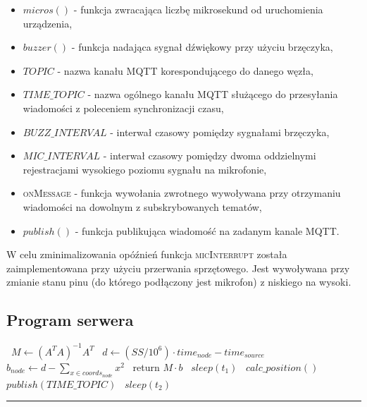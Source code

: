 \begin{itemize}
    \item $micros()$ {-} funkcja zwracająca liczbę mikrosekund od uruchomienia urządzenia,
    \item $buzzer()$ {-} funkcja nadająca sygnał dźwiękowy przy użyciu brzęczyka,
    \item $TOPIC$ {-} nazwa kanału MQTT korespondującego do danego węzła,
    \item $TIME\_TOPIC$ {-} nazwa ogólnego kanału MQTT służącego do przesyłania wiadomości z poleceniem synchronizacji czasu,
    \item $BUZZ\_INTERVAL$ {-} interwał czasowy pomiędzy sygnałami brzęczyka,
    \item $MIC\_INTERVAL$ {-} interwał czasowy pomiędzy dwoma oddzielnymi rejestracjami wysokiego poziomu sygnału na mikrofonie,
    \item \textsc{onMessage} {-} funkcja wywołania zwrotnego wywoływana przy otrzymaniu wiadomości na dowolnym z subskrybowanych tematów,
    \item $publish()$ {-} funkcja publikująca wiadomość na zadanym kanale MQTT.
\end{itemize}

W celu zminimalizowania opóźnień funkcja \textsc{micInterrupt} została zaimplementowana przy użyciu przerwania sprzętowego. Jest wywoływana przy zmianie stanu pinu (do którego podłączony jest mikrofon) z niskiego na wysoki.

\subsection{Program serwera}

\begin{center}
    \begin{algorithmic}[1]
        \State\ $M \gets {\left(A^T A\right)}^{-1} A^T$
        \State\ $d \gets (SS / 10^{6}) \cdot time_{node} - time_{source}$
        \State\ $b_{node} \gets d - \sum_{x \in coords_{node}}{x^2}$
        \EndFor
        \State\ return $M \cdot b$
        \EndFunction
        \State\ $sleep(t_1)$
        \State\ $calc\_position()$
        \EndLoop
        \State\ $publish(TIME\_TOPIC)$
        \State\ $sleep(t_2)$
        \EndLoop
    \end{algorithmic}
    \vspace{5pt}
    \hrule
    \label{alg:server}
\end{center}

